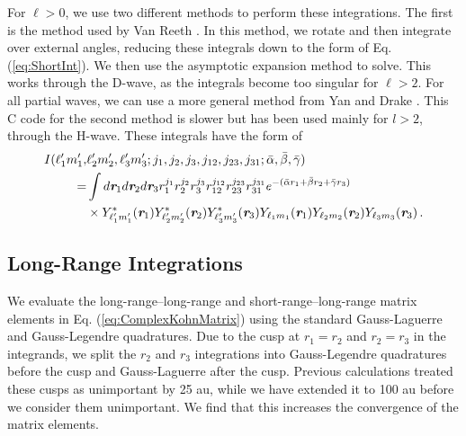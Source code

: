 \documentclass[preprint,showpacs,preprintnumbers,amsmath,amssymb,longbibliography,pra,aps]{revtex4-1}
\begin{document}
For $\ell > 0$, we use two different methods to perform these integrations. The first is the method used by Van Reeth \cite{VanReethThesis}. In this method, we rotate and then integrate over external angles, reducing these integrals down to the form of Eq. (\ref{eq:ShortInt}). We then use the asymptotic expansion method \cite{Drake1995} to solve. This works through the D-wave, as the integrals become too singular for $\ell > 2$. For all partial waves, we can use a more general method from Yan and Drake \cite{Yan1997}. This C code for the second method is slower but has been used mainly for $l > 2$, through the H-wave. These integrals have the form of
\begin{align}
\label{eq:ShortIntGen}
\nonumber I(\ell_1^\prime m_1^\prime, & \ell_2^\prime m_2^\prime, \ell_3^\prime m_3^\prime; j_1,j_2,j_3,j_{12},j_{23},j_{31}; \bar{\alpha}, \bar{\beta}, \bar{\gamma}) \\
\nonumber = & \int
d \textit{\textbf{r}}_1 d \textit{\textbf{r}}_2 d \textit{\textbf{r}}_3
r_1^{j_1} r_2^{j_2} r_3^{j_3} r_{12}^{j_{12}}
r_{23}^{j_{23}} r_{31}^{j_{31}}
e^{-(\bar{\alpha} r_1 + \bar{\beta} r_2 + \bar{\gamma} r_3)} \\
& \times Y_{\ell_1^\prime m_1^\prime}^* (\textit{\textbf{r}}_1) Y_{\ell_2^\prime m_2^\prime}^* (\textit{\textbf{r}}_2) Y_{\ell_3^\prime m_3^\prime}^* (\textit{\textbf{r}}_3)
Y_{\ell_1 m_1} (\textit{\textbf{r}}_1) Y_{\ell_2 m_2} (\textit{\textbf{r}}_2) Y_{\ell_3 m_3} (\textit{\textbf{r}}_3)\, .
\end{align}

\subsection{Long-Range Integrations}
\label{sec:LongInt}
We evaluate the long-range--long-range and short-range--long-range matrix elements in Eq. (\ref{eq:ComplexKohnMatrix}) using the standard Gauss-Laguerre and Gauss-Legendre quadratures. Due to the cusp at $r_1 = r_2$ and $r_2 = r_3$ in the integrands, we split the $r_2$ and $r_3$ integrations into Gauss-Legendre quadratures before the cusp and Gauss-Laguerre after the cusp. Previous calculations \cite{VanReeth2003,VanReeth2004} treated these cusps as unimportant by 25 au, while we have extended it to 100 au before we consider them unimportant. We find that this increases the convergence of the matrix elements.
\end{document}

